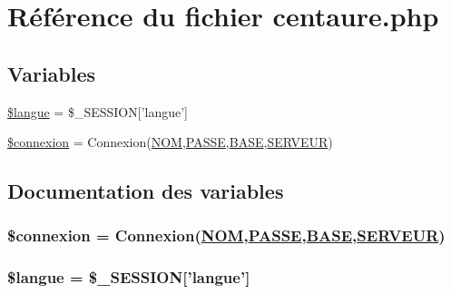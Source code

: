 \hypertarget{centaure_8php}{
\section{R\'{e}f\'{e}rence du fichier centaure.php}
\label{centaure_8php}
}
\subsection*{Variables}
\begin{CompactItemize}
\item 
\hyperlink{centaure_8php_a0}{\$langue} = \$\_\-SESSION\mbox{[}'langue'\mbox{]}
\item 
\hyperlink{centaure_8php_a1}{\$connexion} = Connexion(\hyperlink{pma__connect_8php_a0}{NOM},\hyperlink{pma__connect_8php_a1}{PASSE},\hyperlink{pma__connect_8php_a3}{BASE},\hyperlink{pma__connect_8php_a2}{SERVEUR})
\end{CompactItemize}


\subsection{Documentation des variables}
\hypertarget{centaure_8php_a1}{
\subsubsection[\$connexion]{\setlength{\rightskip}{0pt plus 5cm}\$connexion = Connexion(\hyperlink{pma__connect_8php_a0}{NOM},\hyperlink{pma__connect_8php_a1}{PASSE},\hyperlink{pma__connect_8php_a3}{BASE},\hyperlink{pma__connect_8php_a2}{SERVEUR})}}
\label{centaure_8php_a1}


\hypertarget{centaure_8php_a0}{
\subsubsection[\$langue]{\setlength{\rightskip}{0pt plus 5cm}\$langue = \$\_\-SESSION\mbox{[}'langue'\mbox{]}}}
\label{centaure_8php_a0}



